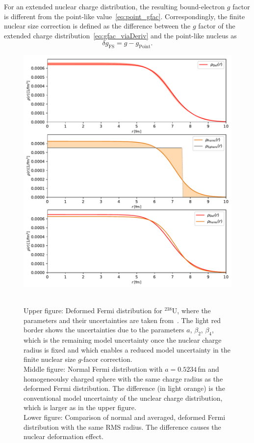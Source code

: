 For an extended nuclear charge distribution, the resulting bound-electron $g$ factor is different from the point-like value~\eqref{eq:point_gfac}. Correspondingly, the finite nuclear size correction is defined as the difference between the $g$ factor of the extended charge distribution~\eqref{eq:gfac_viaDeriv} and the point-like nucleus as
\begin{equation}
\delta g_{\text{FS}}=g-g_{\text{Point}}.
\end{equation}
%
\begin{figure}
\centering
\includegraphics[width=\textwidth]{pics/chargeDistr.pdf}\\
\caption{\label{fig:charge distr.}\\
Upper figure: Deformed Fermi distribution for $^{238}$U, where the parameters and their uncertainties are taken from~\cite{kozhedub2008}. The light red border shows the uncertainties due to the parameters $a$, $\beta_2$, $\beta_4$, which is the remaining model uncertainty once the nuclear charge radius is fixed and which enables a reduced model uncertainty in the finite nuclear size $g$-facor correction.\\
Middle figure: Normal Fermi distribution with $a=0.5234\,$fm and homogeneoulsy charged sphere with the same charge radius as the deformed Fermi distribution. The difference (in light orange) is the conventional model uncertainty of the unclear charge distribution, which is larger as in the upper figure.\\
Lower figure: Comparison of normal and averaged, deformed Fermi distribution with the same RMS radius. The difference causes the nuclear deformation effect.}
\end{figure}
%
